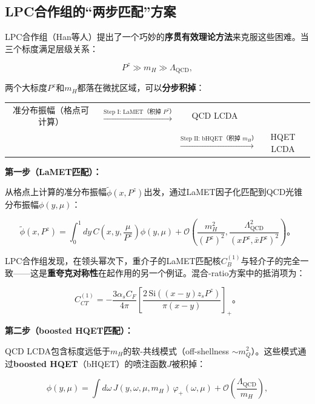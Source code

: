 \documentclass[12pt,a4paper]{ctexart}
\theoremstyle{definition}
\begin{document}
\subsection{LPC合作组的``两步匹配''方案}

LPC合作组（Han等人\cite{Han2025heavy}）提出了一个巧妙的\textbf{序贯有效理论方法}来克服这些困难。当三个标度满足层级关系：

\begin{equation}
\boxed{P^z \gg m_H \gg \Lambda_{\text{QCD}}},
\label{eq:hierarchy}
\end{equation}

两个大标度$P^z$和$m_H$都落在微扰区域，可以\textbf{分步积掉}：

\begin{center}
\begin{tabular}{cccc}
准分布振幅（格点可计算）& $\xrightarrow{\text{Step I: LaMET（积掉 }P^z\text{）}}$ & QCD LCDA & \\
& & $\xrightarrow{\text{Step II: bHQET（积掉 }m_H\text{）}}$ & HQET LCDA \\
\end{tabular}
\end{center}

\textbf{第一步（LaMET匹配）：}

从格点上计算的准分布振幅$\tilde{\phi}(x, P^z)$出发，通过LaMET因子化匹配到QCD光锥分布振幅$\phi(y, \mu)$：

\begin{equation}
\tilde{\phi}(x, P^z) = \int_0^1 dy\, C\left(x, y, \frac{\mu}{P^z}\right) \phi(y, \mu) + \mathcal{O}\left(\frac{m^2_H}{(P^z)^2}, \frac{\Lambda^2_{\text{QCD}}}{(xP^z, \bar{x}P^z)^2}\right)。
\label{eq:step1_LaMET}
\end{equation}

LPC合作组发现，在领头幂次下，重介子的LaMET匹配核$C^{(1)}_B$与轻介子的完全一致——这是\textbf{重夸克对称性}在起作用的另一个例证。混合-ratio方案中的抵消项为：

\begin{equation}
C^{(1)}_{CT} = -\frac{3\alpha_s C_F}{4\pi} \left[\frac{2\,\text{Si}((x-y)z_s P^z)}{\pi(x-y)}\right]_+。
\label{eq:counter_term}
\end{equation}

\textbf{第二步（boosted HQET匹配）：}

QCD LCDA包含标度远低于$m_H$的软-共线模式（off-shellness $\sim m^2_Q$）。这些模式通过\textbf{boosted HQET}（bHQET）的喷注函数$J$被积掉：

\begin{equation}
\phi(y, \mu) = \int d\omega\, J(y, \omega, \mu, m_H) \, \varphi_+(\omega, \mu) + \mathcal{O}\left(\frac{\Lambda_{\text{QCD}}}{m_H}\right),
\label{eq:step2_bHQET}
\end{equation}
\end{document}
